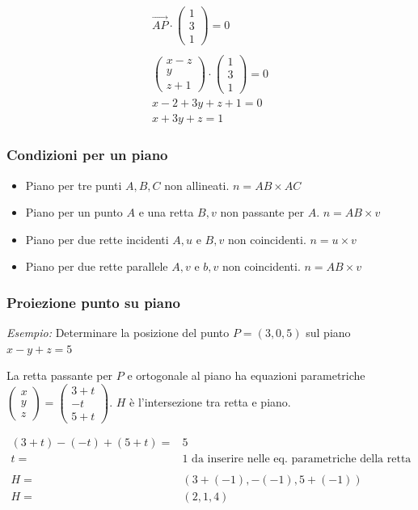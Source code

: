 \documentclass[../main.tex]{subfiles}
\begin{document}
\begin{enumerate}
    \begin{align*}
        \vec{AP} \cdot \begin{pmatrix}
            1 \\ 3 \\ 1
        \end{pmatrix} = 0 \\ \\
        \begin{pmatrix}
            x-z \\ y \\ z+1
        \end{pmatrix} \cdot \begin{pmatrix}
            1 \\ 3 \\1
        \end{pmatrix} = 0 \\
        x-2 +3y+z+1 = 0 \\
        x + 3y + z = 1
        \end{align*}
\end{enumerate}

\subsubsection{Condizioni per un piano}
\begin{itemize}
    \item Piano per tre punti $A,B,C$ non allineati. $n = AB \times AC$
    \item Piano per un punto $A$ e una retta $B,v$ non passante per $A$. $n = AB \times v$
    \item Piano per due rette incidenti $A,u$ e $B,v$ non coincidenti. $n = u \times v$
    \item Piano per due rette parallele $A,v$ e $b,v$ non coincidenti. $n = AB \times v$
\end{itemize}

\vspace{1cm}
\subsubsection{Proiezione punto su piano}
\textit{Esempio:} Determinare la posizione del punto $P=(3,0,5)$ sul piano $x-y+z = 5$

La retta passante per $P$ e ortogonale al piano ha equazioni parametriche $\begin{pmatrix}
    x \\ y \\ z
\end{pmatrix} = \begin{pmatrix}
    3+t \\ -t \\ 5+t
\end{pmatrix}$. $H$ è l'intersezione tra retta e piano.

\begin{align*}
    (3+t) - (-t) + (5+t) =& 5 \\
    t =& 1 \text{ da inserire nelle eq. parametriche della retta}\\ \\
    H =& (3+(-1), -(-1), 5+(-1)) \\
    H =& (2,1,4)
\end{align*}
\end{document}
